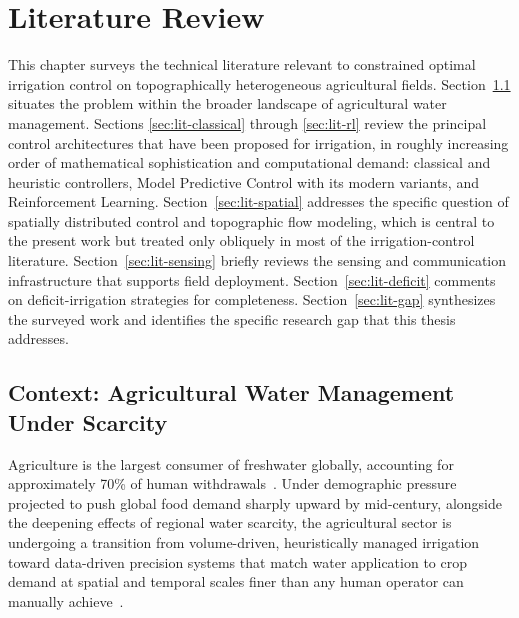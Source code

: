 
\chapter{Literature Review}
\label{chap:lit}

This chapter surveys the technical literature relevant to constrained
optimal irrigation control on topographically heterogeneous agricultural
fields. Section~\ref{sec:lit-context} situates the problem within the
broader landscape of agricultural water management. Sections
\ref{sec:lit-classical} through \ref{sec:lit-rl} review the principal
control architectures that have been proposed for irrigation, in
roughly increasing order of mathematical sophistication and
computational demand: classical and heuristic controllers, Model
Predictive Control with its modern variants, and Reinforcement
Learning. Section~\ref{sec:lit-spatial} addresses the specific question
of spatially distributed control and topographic flow modeling, which
is central to the present work but treated only obliquely in most of
the irrigation-control literature. Section~\ref{sec:lit-sensing}
briefly reviews the sensing and communication infrastructure that
supports field deployment. Section~\ref{sec:lit-deficit} comments on
deficit-irrigation strategies for completeness. Section~\ref{sec:lit-gap}
synthesizes the surveyed work and identifies the specific research
gap that this thesis addresses.

\section{Context: Agricultural Water Management Under Scarcity}
\label{sec:lit-context}

Agriculture is the largest consumer of freshwater globally, accounting
for approximately 70\% of human withdrawals~\cite{Sharma2025,Bayar2025}.
Under demographic pressure projected to push global food demand sharply
upward by mid-century, alongside the deepening effects of regional
water scarcity, the agricultural sector is undergoing a transition from
volume-driven, heuristically managed irrigation toward data-driven
precision systems that match water application to crop demand at
spatial and temporal scales finer than any human operator can
manually achieve~\cite{Sharma2025,LopezJimenez2022,Mgana2026}.

